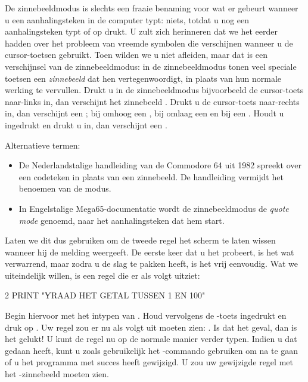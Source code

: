 De zinnebeeldmodus is slechts een fraaie benaming voor wat er gebeurt wanneer u een aanhalingsteken in de computer typt: niets, totdat u nog een aanhalingsteken typt of op  drukt. U zult zich herinneren dat we het eerder hadden over het probleem van vreemde symbolen die verschijnen wanneer u de cursor-toetsen gebruikt. Toen wilden we u niet afleiden, maar dat is een verschijnsel van de zinnebeeldmodus: in de zinnebeeldmodus tonen veel speciale toetsen een {\em zinnebeeld} dat hen vertegenwoordigt, in plaats van hun normale werking te vervullen. Drukt u in de zinnebeeldmodus bijvoorbeeld de cursor-toets naar-links in, dan verschijnt het zinnebeeld . Drukt u de cursor-toets naar-rechts in, dan verschijnt een ; bij omhoog een , bij omlaag een  en bij  een . Houdt u  ingedrukt en drukt u  in, dan verschijnt een .

Alternatieve termen:
\begin{itemize}
  \item De Nederlandstalige handleiding van de Commodore 64 uit 1982 spreekt over een codeteken in plaats van een zinnebeeld. De handleiding vermijdt het benoemen van de modus.
  \item In Engelstalige Mega65-documentatie wordt de zinnebeeldmodus de {\em quote mode} genoemd, naar het aanhalingsteken dat hem start.
\end{itemize}


\needspace{3cm}
Laten we dit dus gebruiken om de tweede regel het scherm te laten wissen wanneer hij de melding  weergeeft. De eerste keer dat u het probeert, is het wat verwarrend, maar zodra u de slag te pakken heeft, is het vrij eenvoudig. Wat we uiteindelijk willen, is een regel die er als volgt uitziet:

\begin{screencode}
2 PRINT "ƳRAAD HET GETAL TUSSEN 1 EN 100"
\end{screencode}

Begin hiervoor met het intypen van . Houd vervolgens de -toets ingedrukt en druk op . Uw regel zou er nu als volgt uit moeten zien: . Is dat het geval, dan is het gelukt! U kunt de regel nu op de normale manier verder typen. Indien u dat gedaan heeft, kunt u zoals gebruikelijk het -commando gebruiken om na te gaan of u het programma met succes heeft gewijzigd. U zou uw gewijzigde regel met het -zinnebeeld moeten zien.

